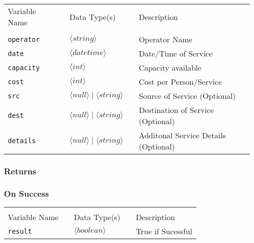 \begin{tabular}{lllll}
Variable Name	&		&	Data Type(s)		&	&	Description	\\
				&	&	&	&	\\
\verb!operator! & \hspace{15mm} & $\langle string\rangle $ 	& \hspace{15mm} & Operator Name \\
\verb!date! 	 & \hspace{15mm} & $\langle datetime\rangle $ & \hspace{15mm} & Date/Time of Service\\
\verb!capacity! & \hspace{15mm} & $\langle int\rangle $ 		& \hspace{15mm} & Capacity available \\
\verb!cost! 	 & \hspace{15mm} & $\langle int\rangle $ 		& \hspace{15mm} & Cost per Person/Service \\
\verb!src! 		 & \hspace{15mm} & $\langle null\rangle  \mid \langle string\rangle $ & \hspace{15mm} & Source of Service (Optional) \\
\verb!dest! 	 & \hspace{15mm} & $\langle null\rangle  \mid \langle string\rangle $ & \hspace{15mm} & Destination of Service (Optional) \\
\verb!details!  & \hspace{15mm} & $\langle null\rangle  \mid \langle string\rangle $ & \hspace{15mm} & Additonal Service Details (Optional) \\
\end{tabular}

\subsubsection{Returns}

\subsubsection{On Success}

\begin{tabular}{lllll}
				&	&	&	&	\\
Variable Name	&		&	Data Type(s)		&	&	Description	\\
\verb!result! & \hspace{15mm} & $\langle boolean\rangle $ & \hspace{15mm} & True if Sucessful \\
\end{tabular}

